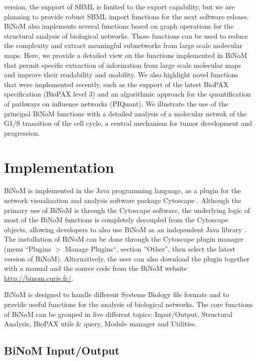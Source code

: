 \documentclass[10pt]{bmc_article}
\newenvironment{bmcformat}{\baselineskip20pt\sloppy\setboolean{publ}{false}}{\baselineskip20pt\sloppy}
\begin{document}
\begin{bmcformat}
version, the support of SBML is limited to the export capability, but we are
planning to provide robust SBML import functions for the next software release. 
BiNoM also implements several functions based on graph operations for the structural analysis of
biological networks. Those functions can be used to reduce the complexity and
extract meaningful subnetworks from large scale molecular maps. Here, we provide
a detailed view on the functions implemented in BiNoM
that permit specific extraction of information from large scale molecular maps
and improve their readability and usability. We also highlight novel functions
that were implemented recently, such as the support of the latest BioPAX
specification (BioPAX level 3) and an algorithmic approach for the
quantification of pathways on influence networks (PIQuant). We illustrate the
use of the principal BiNoM functions with a detailed analysis of a molecular
netwok of the G1/S transition of the cell cycle, a central mechanism
for tumor development and progression.

\section*{Implementation}
BiNoM is implemented in the Java programming language, as a plugin
for the network visualization and analysis software package Cytoscape
\cite{cline2007integration}. Although the primary use of BiNoM is through the
Cytoscape software, the underlying logic of most of the BiNoM functions is completely
decoupled from the Cytoscape objects, allowing developers to also use BiNoM as
an independent Java library \cite{zinovyev2008binom}. The installation of BiNoM
can be done through the Cytoscape plugin manager (menu ``Plugins $>$ Manage
Plugins``, section ''Other'', then select the latest version of BiNoM). Alternatively, the user can
also download the plugin together with a manual and the source code from the
BiNoM website
\url{http://binom.curie.fr/}. 


BiNoM is designed to handle different Systems Biology file formats and to
provide useful functions for the analysis of biological networks. The core
functions of BiNoM can be grouped in five different topics: Input/Output,
Structural Analysis, BioPAX utils \& query, Module manager and Utilities.

\subsection*{BiNoM Input/Output}


\end{bmcformat}
\end{document}
